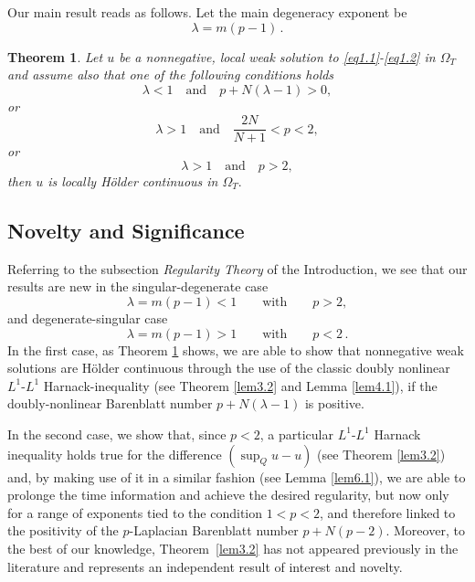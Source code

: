 \documentclass[a4paper,11pt,fullpage]{article}
\numberwithin{equation}{section}
\newtheorem{theorem}{Theorem}[section]
\begin{document}
\noindent Our main result reads as follows. Let the main degeneracy exponent be 
\[\lambda=m(p-1)\,.\]


\begin{theorem}\label{th1.1}
Let $u$ be a nonnegative, local weak solution to \eqref{eq1.1}-\eqref{eq1.2} in $\Omega_T$ and assume also that one of the following conditions holds
\begin{equation}\label{eq1.7}
\lambda<1 \quad \text{and} \quad p+N(\lambda-1)>0,
\end{equation}
or
\begin{equation}\label{eq1.5}
\lambda>1\quad \text{and}\quad
\frac{2N}{N+1}<p<2,
\end{equation}
or
\begin{equation}\label{eq1.6}
\lambda>1\quad \text{and}\quad
p>2,
\end{equation}
then $u$ is locally H\"{o}lder continuous in $\Omega_T.$
\end{theorem}





\subsection{Novelty and Significance} Referring to the subsection {\it Regularity Theory} of the Introduction, we see that our results are new in the singular-degenerate case
\[\lambda=m(p-1)<1 \qquad \text{with} \qquad p>2,\]
and degenerate-singular case
\[\lambda=m(p-1)>1\qquad  \text{with} \qquad p<2\,.\] \noindent In the first case, as Theorem \ref{th1.1} shows, we are able to show that nonnegative weak solutions are H\"older continuous through the use of the classic doubly nonlinear $L^1$-$L^1$ Harnack-inequality (see Theorem \ref{lem3.2} and Lemma \ref{lem4.1}), if the doubly-nonlinear Barenblatt number $p+N(\lambda-1)$ is positive. 

\vskip0.1cm \noindent In the second case, we show that, since $p<2$, a particular $L^1$-$L^1$ Harnack inequality holds true for the difference $(\sup_Q u-u)$ (see Theorem \ref{lem3.2}) and, by making use of it in a similar fashion (see Lemma \ref{lem6.1}),  we are able to prolonge the time information and achieve the desired regularity, but now only for a range of exponents tied to the condition $1<p<2$, and therefore linked to the positivity of the $p$-Laplacian Barenblatt number $p+N(p-2)$. Moreover, to the best of our knowledge, Theorem~\ref{lem3.2}
has not appeared previously in the literature and represents an independent
result of interest and novelty. 
\end{document}
